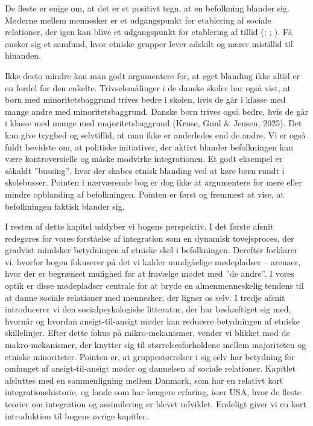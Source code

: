 \documentclass[
]{book}
\begin{document}
De fleste er enige om, at det er et positivt tegn, at en befolkning blander sig. Møderne mellem mennesker er et udgangspunkt for etablering af sociale relationer, der igen kan blive et udgangspunkt for etablering af tillid (; ; ). Få ønsker sig et samfund, hvor etniske grupper lever adskilt og nærer mistillid til hinanden.

Ikke desto mindre kan man godt argumentere for, at øget blanding ikke altid er en fordel for den enkelte. Trivselsmålinger i de danske skoler har også vist, at børn med minoritetsbaggrund trives bedre i skolen, hvis de går i klasse med mange andre med minoritetsbaggrund. Danske børn trives også bedre, hvis de går i klasse med mange med majoritetsbaggrund (Kruse, Guul \& Jensen, 2025). Det kan give tryghed og selvtillid, at man ikke er anderledes end de andre. Vi er også fuldt bevidste om, at politiske initiativer, der aktivt blander befolkningen kan være kontroversielle og måske modvirke integrationen. Et godt eksempel er såkaldt ''bussing'', hvor der skabes etnisk blanding ved at køre børn rundt i skolebusser. Pointen i nærværende bog er dog ikke at argumentere for mere eller mindre opblanding af befolkningen. Pointen er først og fremmest at vise, at befolkningen faktisk blander sig.

I resten af dette kapitel uddyber vi bogens perspektiv. I det første afsnit redegøres for vores forståelse af integration som en dynamisk tovejsproces, der gradvist mindsker betydningen af etniske skel i befolkningen. Derefter forklarer vi, hvorfor bogen fokuserer på det vi kalder uundgåelige mødepladser -- arenaer, hvor der er begrænset mulighed for at fravælge mødet med ''de andre''. I vores optik er disse mødepladser centrale for at bryde en almenmenneskelig tendens til at danne sociale relationer med mennesker, der ligner os selv. I tredje afsnit introducerer vi den socialpsykologiske litteratur, der har beskæftiget sig med, hvornår og hvordan ansigt-til-ansigt møder kan reducere betydningen af etniske skillelinjer. Efter dette fokus på mikro-mekanismer, vender vi blikket mod de makro-mekanismer, der knytter sig til størrelsesforholdene mellem majoriteten og etniske minoriteter. Pointen er, at gruppestørrelser i sig selv har betydning for omfanget af ansigt-til-ansigt møder og dannelsen af sociale relationer. Kapitlet afsluttes med en sammenligning mellem Danmark, som har en relativt kort integrationshistorie, og lande som har længere erfaring, især USA, hvor de fleste teorier om integration og assimilering er blevet udviklet. Endeligt giver vi en kort introduktion til bogens øvrige kapitler.
\end{document}
